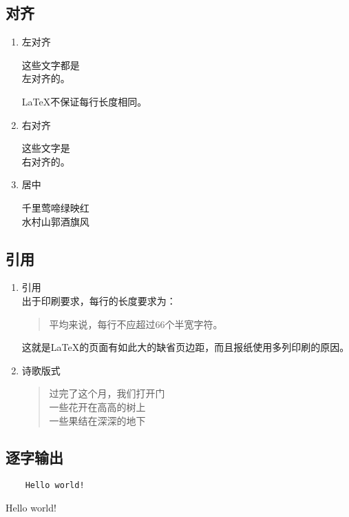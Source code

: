 \documentclass[12pt]{article}
\begin{document}
\subsection{对齐}
\begin{enumerate}
    \item 左对齐
        \begin{flushleft}
            这些文字都是\\ 左对齐的。

            \LaTeX{}不保证每行长度相同。
        \end{flushleft}
    \item 右对齐
        \begin{flushright}
            这些文字是\\ 右对齐的。
        \end{flushright}
    \item{居中}
        \begin{center}
            千里莺啼绿映红\\水村山郭酒旗风
        \end{center}
\end{enumerate}
\subsection{引用}
\begin{enumerate}
    \item 引用\\
        出于印刷要求，每行的长度要求为：
        \begin{quote}
            平均来说，每行不应超过66个半宽字符。
        \end{quote}
        这就是\LaTeX{}的页面有如此大的缺省页边距，而且报纸使用多列印刷的原因。
    \item 诗歌版式
        \begin{flushleft}
            \begin{verse}
                过完了这个月，我们打开门 \\
                一些花开在高高的树上 \\
                一些果结在深深的地下 \\
                \par {}
            \end{verse}
        \end{flushleft}
\end{enumerate}
\subsection{逐字输出}
\begin{verbatim}
    Hello world!
\end{verbatim}
Hello world!
\end{document}
